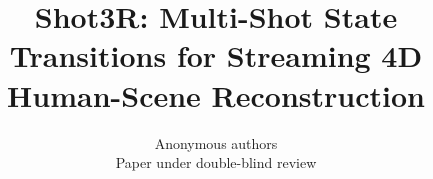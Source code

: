 \title{Shot3R: Multi-Shot State Transitions for Streaming 4D Human-Scene Reconstruction}

\author{Anonymous authors\\
Paper under double-blind review}


\newcommand{\method}{Shot3R}
\newcommand{\humanthree}{Human3R}
\newcommand{\R}{\mathbb{R}}
\newcommand{\SE}{\mathrm{SE}}
\newcommand{\SO}{\mathrm{SO}}
